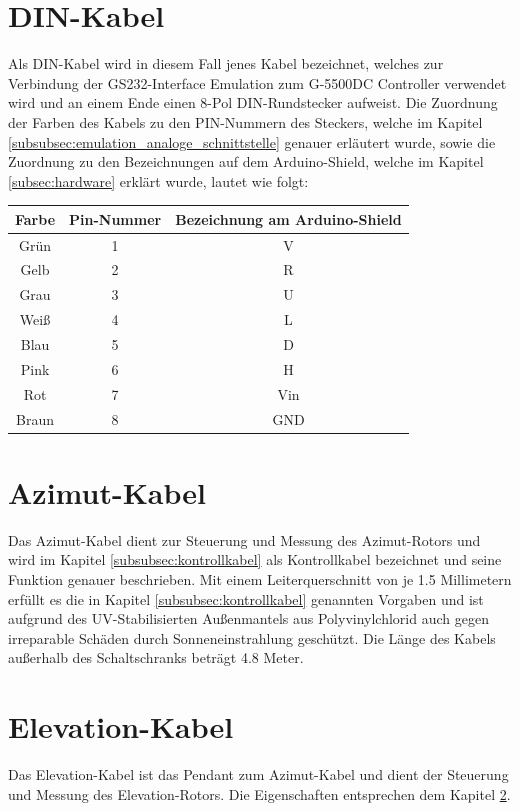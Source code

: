 \section{DIN-Kabel}
\label{sec:DIN-Kabel}
Als DIN-Kabel wird in diesem Fall jenes Kabel bezeichnet, welches zur Verbindung der GS232-Interface Emulation zum G-5500DC Controller verwendet wird und an einem Ende einen 8-Pol DIN-Rundstecker aufweist. Die Zuordnung der Farben des Kabels zu den PIN-Nummern des Steckers, welche im Kapitel \ref{subsubsec:emulation_analoge_schnittstelle} genauer erläutert wurde, sowie die Zuordnung zu den Bezeichnungen auf dem Arduino-Shield, welche im Kapitel \ref{subsec:hardware} erklärt wurde, lautet wie folgt:

\begin{tabular}{c|c|c}
	\textbf{Farbe} & \textbf{Pin-Nummer} & \textbf{Bezeichnung am Arduino-Shield} \\
	\hline
	Grün & 1 & V \\
	Gelb & 2 & R \\
	Grau & 3 & U \\
	Weiß & 4 & L \\
	Blau & 5 & D \\
	Pink & 6 & H \\
	Rot & 7 & Vin \\
	Braun & 8 & GND \\
\end{tabular}

\section{Azimut-Kabel}
\label{sec:azimutkabel}
Das Azimut-Kabel dient zur Steuerung und Messung des Azimut-Rotors und wird im Kapitel \ref{subsubsec:kontrollkabel} als Kontrollkabel bezeichnet und seine Funktion genauer beschrieben. Mit einem Leiterquerschnitt von je 1.5 Millimetern erfüllt es die in Kapitel \ref{subsubsec:kontrollkabel} genannten Vorgaben und ist aufgrund des UV-Stabilisierten Außenmantels aus Polyvinylchlorid auch gegen irreparable Schäden durch Sonneneinstrahlung geschützt. Die Länge des Kabels außerhalb des Schaltschranks beträgt 4.8 Meter. 

\section{Elevation-Kabel}
\label{sec:Elevation-Kabel}
Das Elevation-Kabel ist das Pendant zum Azimut-Kabel und dient der Steuerung und Messung des Elevation-Rotors. Die Eigenschaften entsprechen dem Kapitel \ref{sec:azimutkabel}.

